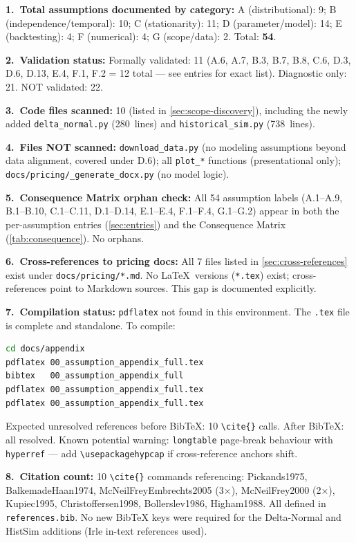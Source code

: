 \documentclass[11pt,a4paper]{article}
\newcommand{\code}[1]{\texttt{#1}}
\begin{document}
\textbf{1.\ Total assumptions documented by category:}
A (distributional): 9; B (independence/temporal): 10;
C (stationarity): 11; D (parameter/model): 14;
E (backtesting): 4; F (numerical): 4; G (scope/data): 2. Total: \textbf{54}.

\textbf{2.\ Validation status:}
Formally validated: 11 (A.6, A.7, B.3, B.7, B.8, C.6, D.3, D.6, D.13, E.4,
F.1, F.2 = 12 total --- see entries for exact list).
Diagnostic only: 21. NOT validated: 22.

\textbf{3.\ Code files scanned:} 10 (listed in \cref{sec:scope-discovery}),
including the newly added \code{delta\_normal.py} (280~lines) and
\code{historical\_sim.py} (738~lines).

\textbf{4.\ Files NOT scanned:} \code{download\_data.py} (no modeling
assumptions beyond data alignment, covered under D.6); all
\code{plot\_*} functions (presentational only);
\code{docs/pricing/\_generate\_docx.py} (no model logic).

\textbf{5.\ Consequence Matrix orphan check:} All 54 assumption labels
(A.1--A.9, B.1--B.10, C.1--C.11, D.1--D.14, E.1--E.4, F.1--F.4, G.1--G.2)
appear in both the per-assumption entries (\cref{sec:entries}) and the
Consequence Matrix (\cref{tab:consequence}). No orphans.

\textbf{6.\ Cross-references to pricing docs:} All 7 files listed in
\cref{sec:cross-references} exist under \code{docs/pricing/*.md}.
No \LaTeX\ versions (\code{*.tex}) exist; cross-references point to Markdown
sources. This gap is documented explicitly.

\textbf{7.\ Compilation status:} \code{pdflatex} not found in this environment.
The \code{.tex} file is complete and standalone. To compile:
\begin{lstlisting}[language=bash]
cd docs/appendix
pdflatex 00_assumption_appendix_full.tex
bibtex   00_assumption_appendix_full
pdflatex 00_assumption_appendix_full.tex
pdflatex 00_assumption_appendix_full.tex
\end{lstlisting}
Expected unresolved references before BibTeX: 10 \verb|\cite{}| calls.
After BibTeX: all resolved. Known potential warning: \code{longtable}
page-break behaviour with \code{hyperref} --- add \code{\textbackslash usepackage{hypcap}}
if cross-reference anchors shift.

\textbf{8.\ Citation count:} 10 \verb|\cite{}| commands referencing:
Pickands1975, BalkemadeHaan1974, McNeilFreyEmbrechts2005 (3$\times$),
McNeilFrey2000 (2$\times$), Kupiec1995, Christoffersen1998, Bollerslev1986,
Higham1988. All defined in \code{references.bib}. No new BibTeX keys
were required for the Delta-Normal and HistSim additions (Irle in-text
references used).



\end{document}

